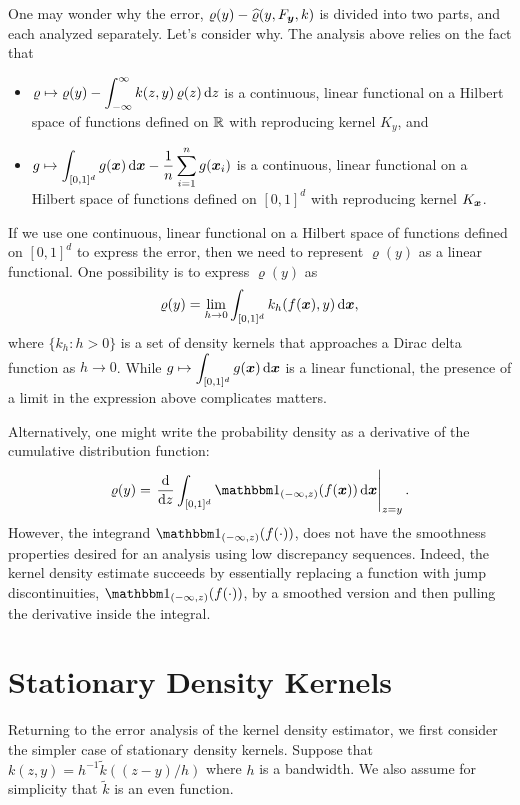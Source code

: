 \documentclass[letterpaper]{amsart}
\newcommand{\hvarrho}{\widehat{\varrho}}
\newcommand{\KY}{K_y}
\newcommand{\KX}{K_{\vx}}
\newcommand{\tk}{\tilde{k}}
\begin{document}
One may wonder why the error, $\varrho(y) - \hvarrho(y,F_{\vy},k)$ is divided into two parts, and each analyzed separately.  Let's consider why.  The analysis above relies on the fact that
\begin{itemize}
	\item $\displaystyle \varrho \mapsto \varrho(y) - \int_{-\infty}^{\infty} k(z,y) \, \varrho(z) \, {\rm d} z$ is a continuous, linear functional on a Hilbert space of functions defined on $\mathbb{R}$ with reproducing kernel $\KY$, and
	\item $\displaystyle g \mapsto \int_{[0,1]^d} g(\boldsymbol{x}) \, {\rm d} \boldsymbol{x} -
	\frac 1n \sum_{i=1}^n g(\boldsymbol{x}_i)$ is a continuous, linear functional on a Hilbert space of functions defined on $[0,1]^d$ with reproducing kernel $\KX$.
\end{itemize}

If we use one continuous, linear functional on a Hilbert space of functions defined on $[0,1]^d$ to express the error, then we need to represent $\varrho(y)$ as a linear functional.  One possibility is to express $\varrho(y)$ as
\begin{equation*}
	\varrho(y) = \lim_{h \to 0} \int_{[0,1]^d} k_h(f(\boldsymbol{x}),y) \,  {\rm d} \boldsymbol{x},
\end{equation*}
where $\{k_h : h >0\}$ is a set of density kernels that approaches a Dirac delta function as $h \to 0$.  While $\displaystyle g \mapsto \int_{[0,1]^d} g(\boldsymbol{x}) \, {\rm d} \boldsymbol{x}$ is a linear functional, the presence of a limit in the expression above complicates matters.

Alternatively, one might write the probability density as a derivative of the cumulative distribution function:
\begin{equation*}
	\varrho(y) = \left . \frac{\dif}{\dif z} \int_{[0,1]^d} \bbone_{(-\infty,z)}(f(\vx))\,  \dif \vx \right \rvert_{z = y}.
\end{equation*}
However, the integrand $\bbone_{(-\infty,z)}(f(\cdot))$, does not have the smoothness properties desired for an analysis using low discrepancy sequences. Indeed, the kernel density estimate succeeds by essentially replacing a function with jump discontinuities, $\bbone_{(-\infty,z)}(f(\cdot))$, by a smoothed version and then pulling the derivative inside the integral.


\section{Stationary Density Kernels}

Returning to the error analysis of the kernel density estimator, we first consider the simpler case of stationary density kernels.  Suppose that $k(z,y) = h^{-1}\tk((z-y)/h)$ where $h$ is a bandwidth. We also assume for simplicity that $\tk$ is an even function.
\end{document}
